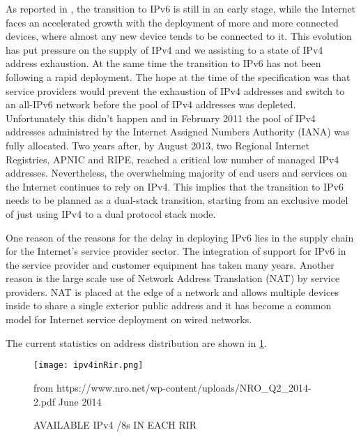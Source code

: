 \documentclass[11pt,a4paper]{scrreprt}
\begin{document}
As reported in \cite{IPv6_state}, the transition to IPv6 is still in an early stage, while the Internet faces an accelerated growth with the deployment of more and more connected devices, where almost any new device tends to be connected to it.  This evolution has put pressure on the supply of IPv4 and we assisting to a state of IPv4 address exhaustion. At the same time the transition to IPv6 has not been following a rapid deployment. The hope at the time of the specification was that service providers would prevent the exhaustion of IPv4 addresses and switch to an all-IPv6 network before the pool of IPv4 addresses was depleted. Unfortunately this didn't happen and in February 2011 the pool of IPv4 addresses administred by the Internet Assigned Numbers Authority (IANA) was fully allocated. Two years after, by August 2013, two Regional Internet Registries, APNIC and RIPE, reached a critical low number of managed IPv4 addresses. Nevertheless, the overwhelming majority of end users and services on the Internet continues to rely on IPv4. This implies that the transition to IPv6 needs to be planned as a dual-stack transition, starting from an exclusive model of just using IPv4 to a dual protocol stack mode.

One reason of the reasons for the delay in deploying IPv6 lies in the supply chain for the Internet's service provider sector. The integration of support for IPv6 in the service provider and customer equipment has taken many years. Another reason is the large scale use of Network Address Translation (NAT) by service providers. NAT is placed at the edge of a network and allows multiple devices inside to share a single exterior public address and it has become a common model for Internet service deployment on wired networks. 

The current statistics on address distribution are shown in \ref{fig:rirs_available_ipv4}.

\begin{figure}[h!]
\centering
\texttt{[image: ipv4inRir.png]}
\caption{AVAILABLE IPv4 /8s IN EACH RIR}
from https://www.nro.net/wp-content/uploads/NRO\_Q2\_2014-2.pdf June 2014
\label{fig:rirs_available_ipv4}
\end{figure}
\end{document}
